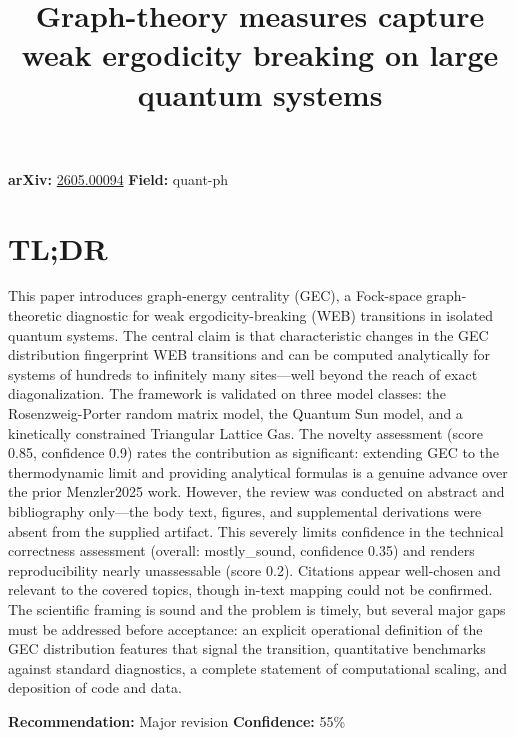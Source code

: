 \documentclass[11pt]{article}
\title{Graph-theory measures capture weak ergodicity breaking on large quantum systems}
\date{}
\begin{document}
\maketitle

\noindent\textbf{arXiv:} \href{https://arxiv.org/abs/2605.00094}{2605.00094} \quad \textbf{Field:} quant-ph\\

\section*{TL;DR}
This paper introduces graph-energy centrality (GEC), a Fock-space graph-theoretic diagnostic for weak ergodicity-breaking (WEB) transitions in isolated quantum systems. The central claim is that characteristic changes in the GEC distribution fingerprint WEB transitions and can be computed analytically for systems of hundreds to infinitely many sites—well beyond the reach of exact diagonalization. The framework is validated on three model classes: the Rosenzweig-Porter random matrix model, the Quantum Sun model, and a kinetically constrained Triangular Lattice Gas. The novelty assessment (score 0.85, confidence 0.9) rates the contribution as significant: extending GEC to the thermodynamic limit and providing analytical formulas is a genuine advance over the prior Menzler2025 work. However, the review was conducted on abstract and bibliography only—the body text, figures, and supplemental derivations were absent from the supplied artifact. This severely limits confidence in the technical correctness assessment (overall: mostly\_sound, confidence 0.35) and renders reproducibility nearly unassessable (score 0.2). Citations appear well-chosen and relevant to the covered topics, though in-text mapping could not be confirmed. The scientific framing is sound and the problem is timely, but several major gaps must be addressed before acceptance: an explicit operational definition of the GEC distribution features that signal the transition, quantitative benchmarks against standard diagnostics, a complete statement of computational scaling, and deposition of code and data.

\textbf{Recommendation:} Major revision \quad \textbf{Confidence:} 55\%\\
\end{document}
